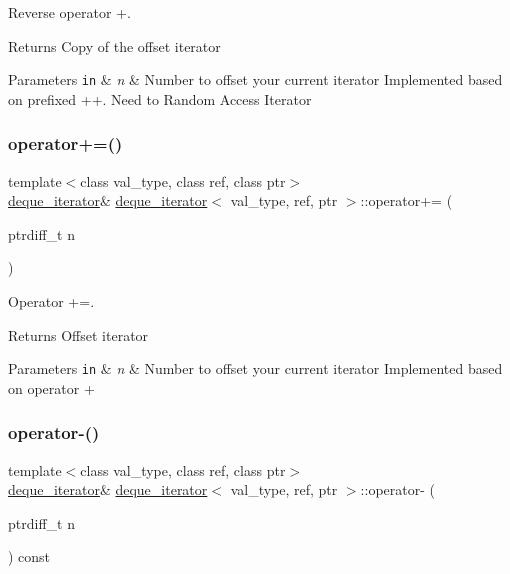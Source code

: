 Reverse operator +. 

\begin{DoxyReturn}{Returns}
Copy of the offset iterator 
\end{DoxyReturn}

\begin{DoxyParams}[1]{Parameters}
\mbox{\tt in}  & {\em n} & Number to offset your current iterator Implemented based on prefixed ++. Need to Random Access Iterator \\
\hline
\end{DoxyParams}
\hypertarget{structdeque__iterator_af9e3da57b8d1952b0ec5af9c706fefcb}{}\label{structdeque__iterator_af9e3da57b8d1952b0ec5af9c706fefcb} 
\subsubsection{\texorpdfstring{operator+=()}{operator+=()}}
{\footnotesize\ttfamily template$<$class val\+\_\+type, class ref, class ptr$>$ \\
\hyperlink{structdeque__iterator}{deque\+\_\+iterator}\& \hyperlink{structdeque__iterator}{deque\+\_\+iterator}$<$ val\+\_\+type, ref, ptr $>$\+::operator+= (\begin{DoxyParamCaption}\item[{ptrdiff\+\_\+t}]{n }\end{DoxyParamCaption})\hspace{0.3cm}{\ttfamily [inline]}}



Operator +=. 

\begin{DoxyReturn}{Returns}
Offset iterator 
\end{DoxyReturn}

\begin{DoxyParams}[1]{Parameters}
\mbox{\tt in}  & {\em n} & Number to offset your current iterator Implemented based on operator + \\
\hline
\end{DoxyParams}
\hypertarget{structdeque__iterator_ac935040db37548e0e0abefd88033dd5c}{}\label{structdeque__iterator_ac935040db37548e0e0abefd88033dd5c} 
\subsubsection{\texorpdfstring{operator-\/()}{operator-()}}
{\footnotesize\ttfamily template$<$class val\+\_\+type, class ref, class ptr$>$ \\
\hyperlink{structdeque__iterator}{deque\+\_\+iterator}\& \hyperlink{structdeque__iterator}{deque\+\_\+iterator}$<$ val\+\_\+type, ref, ptr $>$\+::operator-\/ (\begin{DoxyParamCaption}\item[{ptrdiff\+\_\+t}]{n }\end{DoxyParamCaption}) const\hspace{0.3cm}{\ttfamily [inline]}}



